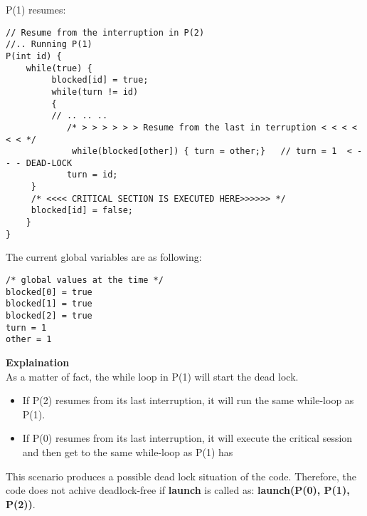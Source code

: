 P(1) resumes:
\begin{lstlisting}
// Resume from the interruption in P(2)
//.. Running P(1)
P(int id) {
    while(true) {
         blocked[id] = true; 
         while(turn != id)
         {
         // .. .. ..
            /* > > > > > > Resume from the last in terruption < < < < < < */
             while(blocked[other]) { turn = other;}   // turn = 1  < - - - DEAD-LOCK
            turn = id;      
     }
     /* <<<< CRITICAL SECTION IS EXECUTED HERE>>>>>> */
     blocked[id] = false;
    }
}
\end{lstlisting}

The current global variables are as following:
\begin{lstlisting}
/* global values at the time */
blocked[0] = true
blocked[1] = true
blocked[2] = true
turn = 1
other = 1
\end{lstlisting}

\textbf{Explaination} \\
As a matter of fact, the while loop in P(1) will start the dead lock. 
\begin{itemize}
    \item If P(2) resumes from its last interruption, it will run the same while-loop as P(1).
    \item If P(0) resumes from its last interruption, it will execute the critical session and then get to the same while-loop as P(1) has
\end{itemize}
This scenario produces a possible dead lock situation of the code. Therefore, the code does not achive deadlock-free if \textbf{launch} is called as: \textbf{launch(P(0), P(1), P(2))}.
